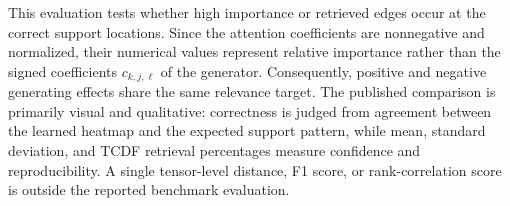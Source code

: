 This evaluation tests whether high importance or retrieved edges occur at the
correct support locations. Since the attention coefficients are nonnegative
and normalized, their numerical values represent relative importance rather
than the signed coefficients $c_{k,j,\ell}$ of the generator. Consequently,
positive and negative generating effects share the same relevance target. The
published comparison is primarily visual and qualitative: correctness is judged
from agreement between the learned heatmap and the expected support pattern,
while mean, standard deviation, and TCDF retrieval percentages measure
confidence and reproducibility. A single tensor-level distance, F1 score, or
rank-correlation score is outside the reported benchmark evaluation.

